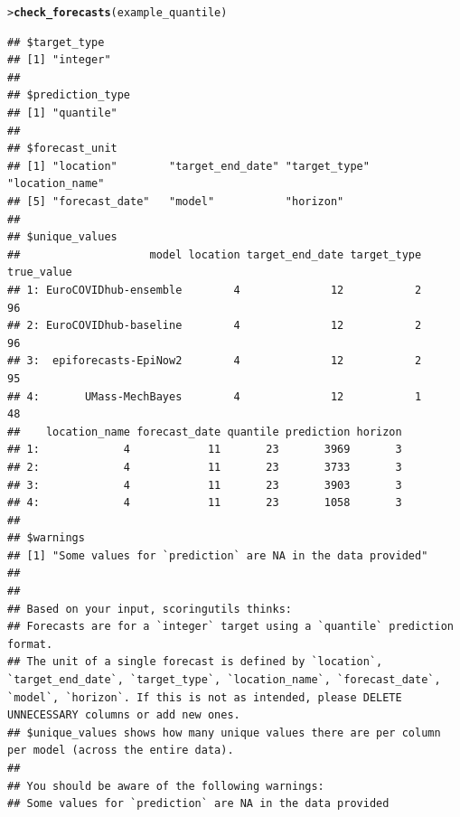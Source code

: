 \documentclass[article,shortnames]{jss}\usepackage[]{graphicx}\usepackage[]{color}
\makeatletter
\newcommand{\hlstd}[1]{\textcolor[rgb]{0.345,0.345,0.345}{#1}}%
\newcommand{\hlkwd}[1]{\textcolor[rgb]{0.737,0.353,0.396}{\textbf{#1}}}%
\newenvironment{kframe}{%
 \def\at@end@of@kframe{}%
 \ifinner\ifhmode%
  \def\at@end@of@kframe{\end{minipage}}%
  \begin{minipage}{\columnwidth}%
 \fi\fi%
 \def\FrameCommand##1{\hskip\@totalleftmargin \hskip-\fboxsep
 \colorbox{shadecolor}{##1}\hskip-\fboxsep
     \hskip-\linewidth \hskip-\@totalleftmargin \hskip\columnwidth}%
 \MakeFramed {\advance\hsize-\width
   \@totalleftmargin\z@ \linewidth\hsize
   \@setminipage}}%
 {\par\unskip\endMakeFramed%
 \at@end@of@kframe}
\newenvironment{knitrout}{}{} %
\makeatother
\begin{document}
\begin{knitrout}
\color{fgcolor}\begin{kframe}
\begin{alltt}
\hlstd{> }\hlkwd{check_forecasts}\hlstd{(example_quantile)}
\end{alltt}
\begin{verbatim}
## $target_type
## [1] "integer"
## 
## $prediction_type
## [1] "quantile"
## 
## $forecast_unit
## [1] "location"        "target_end_date" "target_type"     "location_name"  
## [5] "forecast_date"   "model"           "horizon"        
## 
## $unique_values
##                    model location target_end_date target_type true_value
## 1: EuroCOVIDhub-ensemble        4              12           2         96
## 2: EuroCOVIDhub-baseline        4              12           2         96
## 3:  epiforecasts-EpiNow2        4              12           2         95
## 4:       UMass-MechBayes        4              12           1         48
##    location_name forecast_date quantile prediction horizon
## 1:             4            11       23       3969       3
## 2:             4            11       23       3733       3
## 3:             4            11       23       3903       3
## 4:             4            11       23       1058       3
## 
## $warnings
## [1] "Some values for `prediction` are NA in the data provided"
## 
## 
## Based on your input, scoringutils thinks:
## Forecasts are for a `integer` target using a `quantile` prediction format.
## The unit of a single forecast is defined by `location`, `target_end_date`, `target_type`, `location_name`, `forecast_date`, `model`, `horizon`. If this is not as intended, please DELETE UNNECESSARY columns or add new ones.
## $unique_values shows how many unique values there are per column per model (across the entire data).
## 
## You should be aware of the following warnings:
## Some values for `prediction` are NA in the data provided
\end{verbatim}
\end{kframe}
\end{knitrout}
\end{document}
